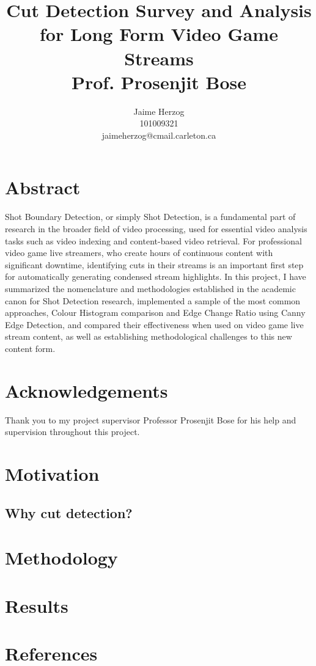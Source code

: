 \documentclass[12pt]{article}
\title{Cut Detection Survey and Analysis for Long Form Video Game Streams \\ Prof. Prosenjit Bose}
\author{Jaime Herzog\\ 101009321 \\ jaimeherzog@cmail.carleton.ca}
\begin{document}
\maketitle
\clearpage

\section{Abstract}
Shot Boundary Detection, or simply Shot Detection, is a fundamental part of research in the broader field of video processing, used for essential video analysis tasks such as 
video indexing and content-based video retrieval. For professional video game live streamers, who create hours of continuous content with significant downtime, identifying
cuts in their streams is an important first step for automatically generating condensed stream highlights. In this project, I have summarized the nomenclature and methodologies
established in the academic canon for Shot Detection research, implemented a sample of the most common approaches, Colour Histogram comparison and Edge Change Ratio using Canny 
Edge Detection, and compared their effectiveness when used on video game live stream content, as well as establishing methodological challenges to this new content form.
\section{Acknowledgements}
Thank you to my project supervisor Professor Prosenjit Bose for his help and supervision throughout this project.
\clearpage

\tableofcontents
\clearpage

\section{Motivation}
\subsection{Why cut detection?}
\Blindtext
\clearpage

\section{Methodology}
\blindtext
\clearpage

\section{Results}
\blindtext
\clearpage

\section{References}
\blindtext
\clearpage
\end{document}
